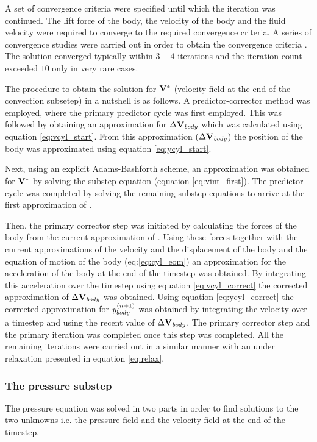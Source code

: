   A set of convergence criteria were specified until which the iteration was continued. The lift force of the body, the velocity of the body and the fluid velocity were required to converge to the required convergence criteria. A series of convergence studies were carried out in order to obtain the convergence criteria \citep{Pregnalato:thesis}. The solution converged typically within $3-4$ iterations and the iteration count exceeded $10$ only in very rare cases.  
  
  The procedure to obtain the solution for $\mathbf{V}^{*}$ (velocity field at the end of the convection subsetep) in a nutshell is as follows. A predictor-corrector method was employed, where the primary predictor cycle was first employed. This was followed by obtaining an approximation for $\Delta\mathbf{V}_{\mathit{body}}$ which was calculated using equation \ref{eq:vcyl_start}. From this approximation ($\Delta\mathbf{V}_{\mathit{body}}$)  the position of the body was approximated using equation \ref{eq:ycyl_start}.
 
 Next, using an explicit Adams-Bashforth scheme, an approximation was obtained for $\mathbf{V}^{*}$ by solving the substep equation (equation \ref{eq:vint_first}). The predictor cycle was completed by solving the remaining substep equations to arrive at the first approximation of \Vnext.   
 
 Then, the primary corrector step was initiated by calculating the forces of the body from the current approximation of \Vnext. Using these forces together with the current approximations of the velocity and the displacement of the body and the equation of motion of the body (eq:\ref{eq:cyl_eom}) an approximation for the acceleration of the body at the end of the timestep was obtained. By integrating this acceleration over the timestep using equation \ref{eq:vcyl_correct} the corrected approximation of $\Delta\mathbf{V}_{\mathit{body}}$ was obtained. Using equation \ref{eq:ycyl_correct} the corrected approximation for $y_{body}^{(n+1)}$  was obtained by integrating the velocity over a timestep and using the recent value of $\Delta\mathbf{V}_{\mathit{body}}$. The primary corrector step and the primary iteration was completed once this step was completed. All the remaining iterations were carried out in a similar manner with an under relaxation presented in equation \ref{eq:relax}. 
 
 
\subsubsection{The pressure substep}

The pressure equation was solved in two parts in order to find solutions to the two unknowns i.e. the pressure field and the velocity field at the end of the timestep. 
 
